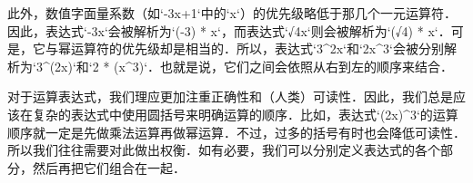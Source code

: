 此外，数值字面量系数（如`-3x+1`中的`x`）的优先级略低于那几个一元运算符．因此，表达式`-3x`会被解析为`(-3) * x`，而表达式`√4x`则会被解析为`(√4) * x`．可是，它与幂运算符的优先级却是相当的．所以，表达式`3^2x`和`2x^3`会被分别解析为`3^(2x)`和`2 * (x^3)`．也就是说，它们之间会依照从右到左的顺序来结合．

对于运算表达式，我们理应更加注重正确性和（人类）可读性．因此，我们总是应该在复杂的表达式中使用圆括号来明确运算的顺序．比如，表达式`(2x)^3`的运算顺序就一定是先做乘法运算再做幂运算．不过，过多的括号有时也会降低可读性．所以我们往往需要对此做出权衡．如有必要，我们可以分别定义表达式的各个部分，然后再把它们组合在一起．